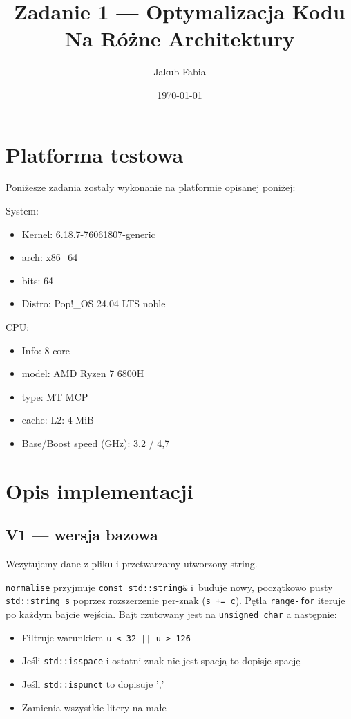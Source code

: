 \documentclass[11pt,a4paper]{article}
\title{Zadanie 1 --- Optymalizacja Kodu Na Różne Architektury}
\author{Jakub Fabia}
\date{\today}
\begin{document}
\maketitle

\section{Platforma testowa}

Poniżesze zadania zostały wykonanie na platformie opisanej poniżej: 

System:
\begin{itemize}
\item   Kernel: 6.18.7-76061807-generic 
\item   arch: x86\_64 
\item   bits: 64
\item   Distro: Pop!\_OS 24.04 LTS noble
\end{itemize}

CPU:
\begin{itemize}
\item   Info: 8-core 
\item   model: AMD Ryzen 7 6800H
\item   type: MT MCP 
\item   cache: L2: 4 MiB 
\item   Base/Boost speed (GHz): 3.2 / 4,7
\end{itemize}

\section{Opis implementacji}

\subsection{V1 --- wersja bazowa}
Wczytujemy dane z pliku i przetwarzamy utworzony string.

\texttt{normalise} przyjmuje \texttt{const std::string\&} i~buduje nowy, początkowo pusty \texttt{std::string s} poprzez rozszerzenie per-znak (\texttt{s += c}). Pętla \texttt{range-for} iteruje po każdym bajcie wejścia. Bajt rzutowany jest na \texttt{unsigned char} a następnie:
\begin{itemize}
    \item Filtruje warunkiem \texttt{u < 32 || u > 126}
    \item Jeśli \texttt{std::isspace} i ostatni znak nie jest spacją to dopisje spację
    \item Jeśli \texttt{std::ispunct} to dopisuje ','
    \item Zamienia wszystkie litery na małe
\end{itemize}
\end{document}
